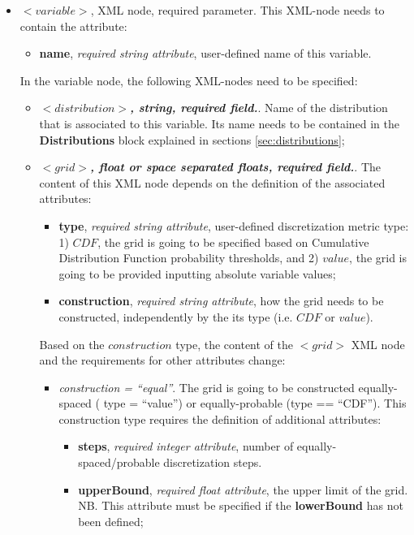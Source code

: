 \begin{itemize}
\item $<variable>$, XML node, required parameter. This XML-node needs to contain the attribute:
\begin{itemize}
  \item \textbf{name}, \textit{required string attribute}, user-defined name of this variable.
 \end{itemize}
 In the variable node, the following XML-nodes need to be specified:
 \begin{itemize}
    \item $<distribution>$\textbf{\textit{, string, required field.}}. Name of the distribution that is associated to this variable. Its name needs to be contained in the \textbf{Distributions} block explained in sections \ref{sec:distributions};
    \item $<grid>$\textbf{\textit{, float or space separated floats, required field.}}. The content of this XML node depends on the definition of the associated attributes:
\begin{itemize}
\itemsep0em
\item \textbf{type}, \textit{required string attribute}, user-defined discretization metric type: 1) $CDF$, the grid is going to be specified based on  Cumulative Distribution Function probability thresholds, and 2) $value$, the grid is going to be provided inputting absolute variable values;
\item \textbf{construction}, \textit{required string attribute}, how the grid needs to be constructed, independently by the its type (i.e. $CDF$ or $value$).
\end{itemize}
Based on the $construction$ type, the content of the $<grid>$ XML node and the requirements for other attributes change:
\begin{itemize}
  \item \textit{construction = ``equal''}. The grid is going to be constructed equally-spaced ( type = ``value'') or equally-probable (type == ``CDF''). This construction type requires the definition of additional attributes:
      \begin{itemize}
         \item \textbf{steps}, \textit{required integer attribute}, number of equally-spaced/probable discretization steps.
         \item \textbf{upperBound}, \textit{required float attribute}, the upper limit of the grid.
        NB. This attribute must be specified if the \textbf{lowerBound} has not been defined;

\end{itemize}
\end{itemize}
\end{itemize}
\end{itemize}
